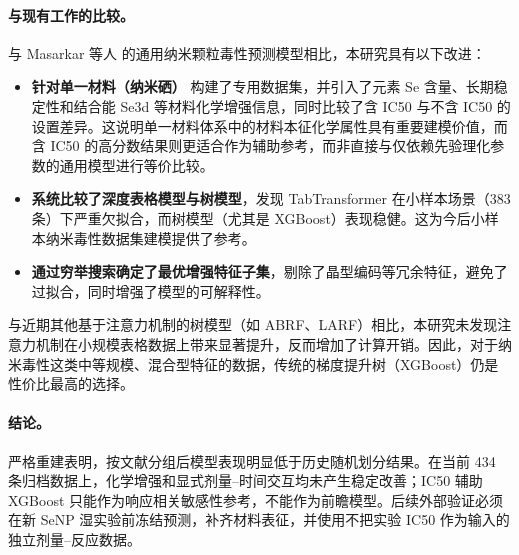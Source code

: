 \paragraph{与现有工作的比较。}
与 Masarkar 等人 \cite{masarkar2024} 的通用纳米颗粒毒性预测模型相比，本研究具有以下改进：
\begin{itemize}
  \item \textbf{针对单一材料（纳米硒）} 构建了专用数据集，并引入了元素 Se 含量、长期稳定性和结合能 Se3d 等材料化学增强信息，同时比较了含 IC50 与不含 IC50 的设置差异。这说明单一材料体系中的材料本征化学属性具有重要建模价值，而含 IC50 的高分数结果则更适合作为辅助参考，而非直接与仅依赖先验理化参数的通用模型进行等价比较。
  \item \textbf{系统比较了深度表格模型与树模型}，发现 TabTransformer 在小样本场景（383 条）下严重欠拟合，而树模型（尤其是 XGBoost）表现稳健。这为今后小样本纳米毒性数据集建模提供了参考。
  \item \textbf{通过穷举搜索确定了最优增强特征子集}，剔除了晶型编码等冗余特征，避免了过拟合，同时增强了模型的可解释性。
\end{itemize}
与近期其他基于注意力机制的树模型（如 ABRF、LARF）相比，本研究未发现注意力机制在小规模表格数据上带来显著提升，反而增加了计算开销。因此，对于纳米毒性这类中等规模、混合型特征的数据，传统的梯度提升树（XGBoost）仍是性价比最高的选择。

\paragraph{结论。}
严格重建表明，按文献分组后模型表现明显低于历史随机划分结果。在当前 434 条归档数据上，化学增强和显式剂量--时间交互均未产生稳定改善；IC50 辅助 XGBoost 只能作为响应相关敏感性参考，不能作为前瞻模型。后续外部验证必须在新 SeNP 湿实验前冻结预测，补齐材料表征，并使用不把实验 IC50 作为输入的独立剂量--反应数据。
